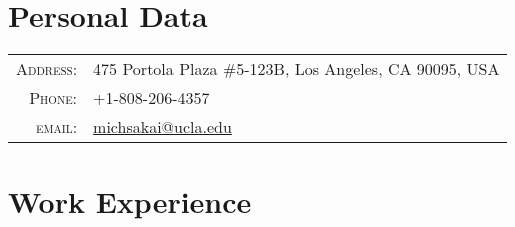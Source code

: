 \documentclass[a4paper,10pt]{article} %
\begin{document}
\pagestyle{empty} %



\par{\bigskip\par} %

\section{Personal Data}

\begin{tabular}{rl}
\textsc{Address:} & 475 Portola Plaza \#5-123B, Los Angeles, CA 90095, USA\\
\textsc{Phone:} & +1-808-206-4357\\
\textsc{email:} & \href{mailto:michsakai@ucla.edu}{michsakai@ucla.edu}
\end{tabular}


\section{Work Experience}
\end{document}
